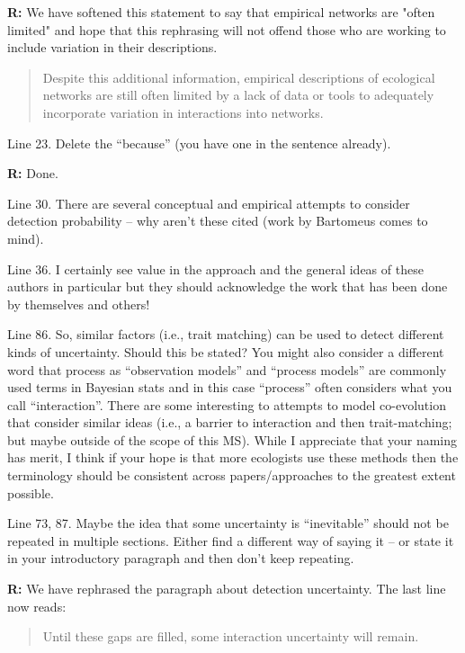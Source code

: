\documentclass[12pt]{letter}
\begin{document}
	\textbf{R:} We have softened this statement to say that empirical networks are "often limited" and hope that this rephrasing will not offend those who are working to include variation in their descriptions.

		\begin{quotation}
			Despite this additional information, empirical descriptions of ecological networks are still often limited by a lack of data or tools to adequately incorporate variation in interactions into networks.
		\end{quotation}

	Line 23.  Delete the “because” (you have one in the sentence already).

	\textbf{R:} Done.

Line 30.  There are several conceptual and empirical attempts to consider detection probability – why aren’t these cited (work by Bartomeus comes to mind).

Line 36.  I certainly see value in the approach and the general ideas of these authors in particular but they should acknowledge the work that has been done by themselves and others!

Line 86.  So, similar factors (i.e., trait matching) can be used to detect different kinds of uncertainty.  Should this be stated?  You might also consider a different word that process as “observation models” and “process models” are commonly used terms in Bayesian stats and in this case “process” often considers what you call “interaction”.  There are some interesting to attempts to model co-evolution that consider similar ideas (i.e., a barrier to interaction and then trait-matching; but maybe outside of the scope of this MS). While I appreciate that your naming has merit, I think if your hope is that more ecologists use these methods then the terminology should be consistent across papers/approaches to the greatest extent possible.

	Line 73, 87.  Maybe the idea that some uncertainty is “inevitable” should not be repeated in multiple sections.  Either find a different way of saying it – or state it in your introductory paragraph and then don’t keep repeating.

	\textbf{R:} We have rephrased the paragraph about detection uncertainty. The last line now reads:
		
		\begin{quotation}

			Until these gaps are filled, some interaction uncertainty will remain.

		\end{quotation}
\end{document}
